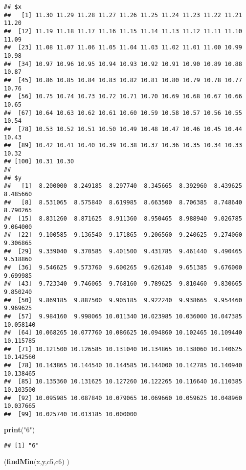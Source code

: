 \documentclass[]{article}
\newenvironment{Shaded}{\begin{snugshade}}{\end{snugshade}}
\newcommand{\KeywordTok}[1]{\textcolor[rgb]{0.13,0.29,0.53}{\textbf{#1}}}
\newcommand{\StringTok}[1]{\textcolor[rgb]{0.31,0.60,0.02}{#1}}
\newcommand{\NormalTok}[1]{#1}
\begin{document}
\begin{verbatim}
## $x
##   [1] 11.30 11.29 11.28 11.27 11.26 11.25 11.24 11.23 11.22 11.21 11.20
##  [12] 11.19 11.18 11.17 11.16 11.15 11.14 11.13 11.12 11.11 11.10 11.09
##  [23] 11.08 11.07 11.06 11.05 11.04 11.03 11.02 11.01 11.00 10.99 10.98
##  [34] 10.97 10.96 10.95 10.94 10.93 10.92 10.91 10.90 10.89 10.88 10.87
##  [45] 10.86 10.85 10.84 10.83 10.82 10.81 10.80 10.79 10.78 10.77 10.76
##  [56] 10.75 10.74 10.73 10.72 10.71 10.70 10.69 10.68 10.67 10.66 10.65
##  [67] 10.64 10.63 10.62 10.61 10.60 10.59 10.58 10.57 10.56 10.55 10.54
##  [78] 10.53 10.52 10.51 10.50 10.49 10.48 10.47 10.46 10.45 10.44 10.43
##  [89] 10.42 10.41 10.40 10.39 10.38 10.37 10.36 10.35 10.34 10.33 10.32
## [100] 10.31 10.30
## 
## $y
##   [1]  8.200000  8.249185  8.297740  8.345665  8.392960  8.439625  8.485660
##   [8]  8.531065  8.575840  8.619985  8.663500  8.706385  8.748640  8.790265
##  [15]  8.831260  8.871625  8.911360  8.950465  8.988940  9.026785  9.064000
##  [22]  9.100585  9.136540  9.171865  9.206560  9.240625  9.274060  9.306865
##  [29]  9.339040  9.370585  9.401500  9.431785  9.461440  9.490465  9.518860
##  [36]  9.546625  9.573760  9.600265  9.626140  9.651385  9.676000  9.699985
##  [43]  9.723340  9.746065  9.768160  9.789625  9.810460  9.830665  9.850240
##  [50]  9.869185  9.887500  9.905185  9.922240  9.938665  9.954460  9.969625
##  [57]  9.984160  9.998065 10.011340 10.023985 10.036000 10.047385 10.058140
##  [64] 10.068265 10.077760 10.086625 10.094860 10.102465 10.109440 10.115785
##  [71] 10.121500 10.126585 10.131040 10.134865 10.138060 10.140625 10.142560
##  [78] 10.143865 10.144540 10.144585 10.144000 10.142785 10.140940 10.138465
##  [85] 10.135360 10.131625 10.127260 10.122265 10.116640 10.110385 10.103500
##  [92] 10.095985 10.087840 10.079065 10.069660 10.059625 10.048960 10.037665
##  [99] 10.025740 10.013185 10.000000
\end{verbatim}

\begin{Shaded}
\begin{Highlighting}[]
\KeywordTok{print}\NormalTok{(}\StringTok{"6"}\NormalTok{)}
\end{Highlighting}
\end{Shaded}

\begin{verbatim}
## [1] "6"
\end{verbatim}

\begin{Shaded}
\begin{Highlighting}[]
\NormalTok{(}\KeywordTok{findMin}\NormalTok{(x,y,c5,c6) )}
\end{Highlighting}
\end{Shaded}
\end{document}
